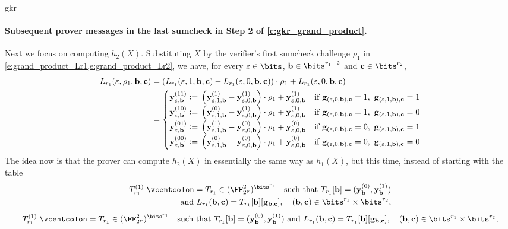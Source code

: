 \begin{lncsappendix}{gkr}
\paragraph{Subsequent prover messages in the last sumcheck in Step 2 of \cref{c:gkr_grand_product}.} Next we focus on computing $h_2(X)$. Substituting $X$ by the verifier's first sumcheck challenge $\rho_1$ in \cref{e:grand_product_Lr1,e:grand_product_Lr2}, we have, for every $\eps\in \bits$, $\bb\in \bits^{r_1-2}$ and $\cc\in \bits^{r_2}$, 
%
\begin{align*}
L_{r_1}(\eps,\rho_1,\bb, \cc) &   =\left(L_{r_1}(\eps, 1, \bb,\cc) -  L_{r_1}(\eps, 0, \bb,\cc)\right)\cdot \rho_1 + L_{r_1}(\eps, 0, \bb,\cc)\\ &= \begin{cases}
\yy_{\eps,\bb}^{(11)}\defeq \left(\yy_{\eps,1,\bb}^{(1)} - \yy_{\eps,0,\bb}^{(1)}\right)\cdot \rho_1 + \yy_{\eps,0,\bb}^{(1)} &\text{if } \bfg_{(\eps,0,\bb),\cc}=1,\ \bfg_{(\eps,1,\bb),\cc}=1 \\  
\yy_{\eps,\bb}^{(10)}\defeq \left(\yy_{\eps,1,\bb}^{(0)} - \yy_{\eps,0,\bb}^{(1)}\right)\cdot \rho_1 + \yy_{\eps,0,\bb}^{(1)}&\text{if } \bfg_{(\eps,0,\bb),\cc}=1,\ \bfg_{(\eps,1,\bb),\cc}=0\\
\yy_{\eps,\bb}^{(01)}\defeq 
\left(\yy_{\eps,1,\bb}^{(1)} - \yy_{\eps,0,\bb}^{(0)}\right)\cdot \rho_1 + \yy_{\eps,0,\bb}^{(0)} & \text{if } \bfg_{(\eps,0,\bb),\cc}=0,\ \bfg_{(\eps,1,\bb),\cc}=1 \\
    \yy_{\eps,\bb}^{(00)}\defeq \left(\yy_{\eps,1,\bb}^{(0)} - \yy_{\eps,0,\bb}^{(0)}\right)\cdot \rho_1 + \yy_{\eps,0,\bb}^{(0)} &\text{if } \bfg_{(\eps,0,\bb),\cc}=0,\  \bfg_{(\eps,1,\bb),\cc}=0
\end{cases}
\end{align*}
The idea now is that the prover can compute $h_2(X)$ in essentially  the same way as  $h_1(X)$, but this time, instead of starting with the table \iflncs$$\begin{aligned}T_{r_1}^{(1)}\defeq T_{r_1}\in (\comfield^2)^{\bits^{r_1}} \quad \text{such that } T_{r_1}[\bb]=(\yy_\bb^{(0)}, \yy_{\bb}^{(1)})\\ \text{and } L_{r_1}(\bb,\cc) = T_{r_1}[\bb][\bfg_{\bb,\cc}], \quad  (\bb,\cc)\in \bits^{r_1}\times \bits^{r_2},\end{aligned}$$\else$$T_{r_1}^{(1)}\defeq T_{r_1}\in (\comfield^2)^{\bits^{r_1}} \quad \text{such that } T_{r_1}[\bb]=(\yy_\bb^{(0)}, \yy_{\bb}^{(1)}) \text{ and } L_{r_1}(\bb,\cc) = T_{r_1}[\bb][\bfg_{\bb,\cc}], \quad  (\bb,\cc)\in \bits^{r_1}\times \bits^{r_2},$$\fi

\end{lncsappendix}
